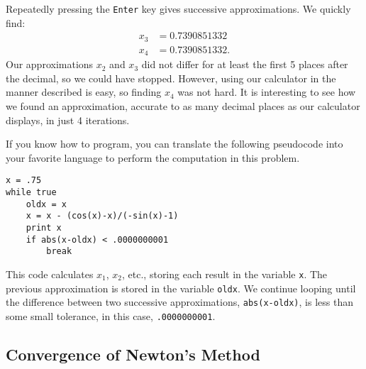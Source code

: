 {Repeatedly pressing the \texttt{Enter} key gives successive approximations.  We quickly find:
\begin{align*}
x_3 &= 0.7390851332\\
x_4 &= 0.7390851332.
\end{align*}
Our approximations $x_2$ and $x_3$ did not differ for at least the first 5 places after the decimal, so we could have stopped. However, using our calculator in the manner described is easy, so finding $x_4$ was not hard. It is interesting to see how we found an approximation, accurate to as many decimal places as our calculator displays, in just 4 iterations.}

If you know how to program, you can translate the following pseudocode into your favorite language to perform the computation in this problem.
\begin{center}
\begin{verbatim}
x = .75
while true
    oldx = x
    x = x - (cos(x)-x)/(-sin(x)-1)
    print x
    if abs(x-oldx) < .0000000001
        break
\end{verbatim}
\end{center}


This code calculates $x_1$, $x_2$, etc., storing each result in the variable \texttt{x}.  The previous approximation is stored in the variable \texttt{oldx}.  We continue looping until the difference between two successive approximations, \texttt{abs(x-oldx)}, is less than some small tolerance, in this case,
\texttt{.0000000001}.

\subsection{Convergence of Newton's Method}

